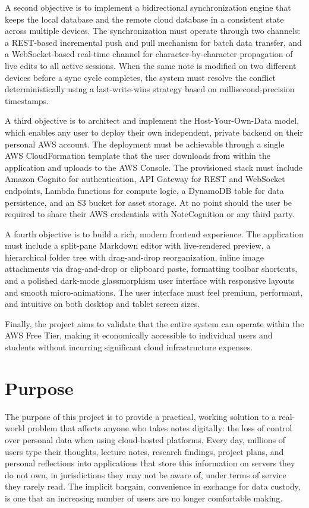 \documentclass[12pt, a4paper, oneside]{report}
\begin{document}
A second objective is to implement a bidirectional synchronization engine that keeps the local database and the remote cloud database in a consistent state across multiple devices. The synchronization must operate through two channels: a REST-based incremental push and pull mechanism for batch data transfer, and a WebSocket-based real-time channel for character-by-character propagation of live edits to all active sessions. When the same note is modified on two different devices before a sync cycle completes, the system must resolve the conflict deterministically using a last-write-wins strategy based on millisecond-precision timestamps.

A third objective is to architect and implement the Host-Your-Own-Data model, which enables any user to deploy their own independent, private backend on their personal AWS account. The deployment must be achievable through a single AWS CloudFormation template that the user downloads from within the application and uploads to the AWS Console. The provisioned stack must include Amazon Cognito for authentication, API Gateway for REST and WebSocket endpoints, Lambda functions for compute logic, a DynamoDB table for data persistence, and an S3 bucket for asset storage. At no point should the user be required to share their AWS credentials with NoteCognition or any third party.

A fourth objective is to build a rich, modern frontend experience. The application must include a split-pane Markdown editor with live-rendered preview, a hierarchical folder tree with drag-and-drop reorganization, inline image attachments via drag-and-drop or clipboard paste, formatting toolbar shortcuts, and a polished dark-mode glassmorphism user interface with responsive layouts and smooth micro-animations. The user interface must feel premium, performant, and intuitive on both desktop and tablet screen sizes.

Finally, the project aims to validate that the entire system can operate within the AWS Free Tier, making it economically accessible to individual users and students without incurring significant cloud infrastructure expenses.

\section{Purpose}

The purpose of this project is to provide a practical, working solution to a real-world problem that affects anyone who takes notes digitally: the loss of control over personal data when using cloud-hosted platforms. Every day, millions of users type their thoughts, lecture notes, research findings, project plans, and personal reflections into applications that store this information on servers they do not own, in jurisdictions they may not be aware of, under terms of service they rarely read. The implicit bargain, convenience in exchange for data custody, is one that an increasing number of users are no longer comfortable making.
\end{document}
